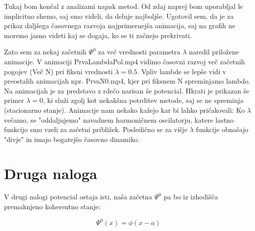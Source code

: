 \documentclass{article}
\begin{document}
Tukaj bom končal z analizami napak metod. Od zdaj naprej bom uporabljal le implicitno shemo, saj smo videli, da deluje najboljše. Ugotovil sem, da je za prikaz daljšega časovnega razvoja najprimernejša animacija, saj na grafih ne moremo jasno videti kaj se dogaja, ko se ti začnejo prekrivati. 

Zato sem za nekaj začetnih $\Psi^0$ za več vrednosti parametra $\lambda$ naredil priložene animacije. V animaciji PrvaLambdaPol.mp4 vidimo časovni razvoj več začetnih pogojev (Več N) pri fiksni vrednosti $\lambda = 0.5$. Vpliv lambde se lepše vidi v preostalih animacijah npr. PrvaN0.mp4, kjer pri fiksnem N spreminjamo lambdo. Na animacijah je za predstavo z rdečo narisan še potencial. Hkrati je prikazan še primer $\lambda=0$, ki služi zgolj kot nekakšna potrditev metode, saj se ne spreminja (stacionarno stanje). Animacije nam nekako kažejo kar bi lahko pričakovali: Ko $\lambda$ večamo, se "oddaljujemo" navadnem harmoničnem oscilatorju, katere lastno funkcijo smo vzeli za začetni približek. Posledično se za višje $\lambda$ funkcije obnašajo "divje" in imajo bogatejšo časovno dinamiko.

\section{Druga naloga}

V drugi nalogi potencial ostaja isti, naša začetna $\Psi^0$ pa bo iz izhodišča premaknjeno koherentno stanje:

\begin{equation*}
\Psi^0(x) = \phi(x-a)
\end{equation*}
\end{document}
